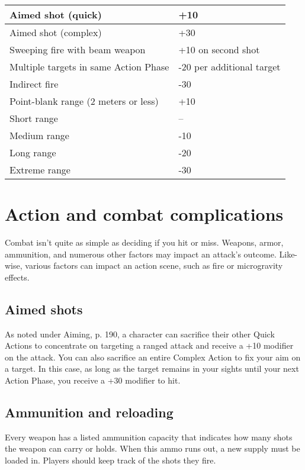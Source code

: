 \begin{tabular}{|l|l|}
\hline
Aimed shot (quick) & +10 \\
\hline
Aimed shot (complex) & +30 \\
\hline
Sweeping fire with beam weapon & +10 on second shot \\
\hline
Multiple targets in same Action Phase & -20 per additional target \\
\hline
Indirect fire & -30 \\
\hline
Point-blank range (2 meters or less) & +10 \\
\hline
Short range & -- \\
\hline
Medium range & -10 \\
\hline
Long range & -20 \\
\hline
Extreme range & -30 \\ \hline
\end{tabular}


\section{Action and combat complications}
\label{sec:action-combat-comp}

Combat isn’t quite as simple as deciding if you hit or miss. Weapons, armor, ammunition, and numerous other factors may impact an attack’s outcome. Like- wise, various factors can impact an action scene, such as fire or microgravity effects.


\subsection{Aimed shots}
\label{sec:aimed-shots}

As noted under Aiming, p. 190, a character can sacrifice their other Quick Actions to concentrate on targeting a ranged attack and receive a +10 modifier on the attack. You can also sacrifice an entire Complex Action to fix your aim on a target. In this case, as long as the target remains in your sights until your next Action Phase, you receive a +30 modifier to hit.


\subsection{Ammunition and reloading}
\label{sec:ammunition-reloading}

Every weapon has a listed ammunition capacity that indicates how many shots the weapon can carry or holds. When this ammo runs out, a new supply must be loaded in. Players should keep track of the shots they fire.


